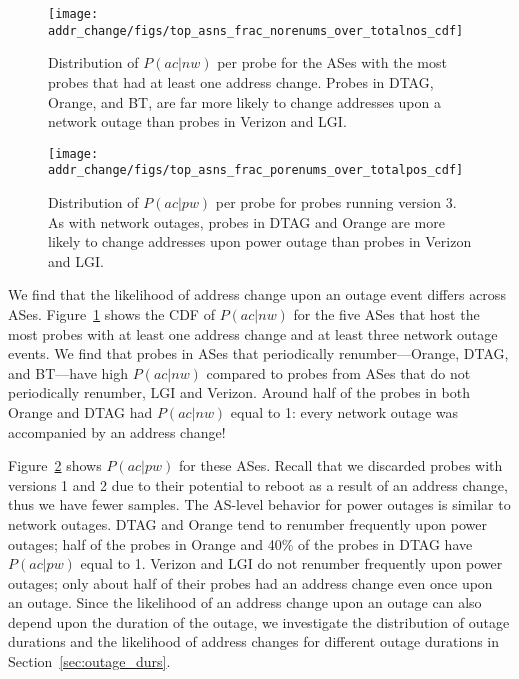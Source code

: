 \begin{figure}[tb]
  \begin{center}
    \texttt{[image: addr\_change/figs/top\_asns\_frac\_norenums\_over\_totalnos\_cdf]}
  \end{center}
  \caption{\label{fig:top_asns_frac_norenums_over_totalnos}
Distribution of $P(ac|nw)$ per probe for the ASes with the most probes
that had at least one address change. Probes in DTAG, Orange, and BT, are far more likely to change addresses upon a
    network outage than probes in Verizon and LGI.}
\end{figure}

\begin{figure}[tb]
  \begin{center}
    \texttt{[image: addr\_change/figs/top\_asns\_frac\_porenums\_over\_totalpos\_cdf]}
  \end{center}
  \caption{\label{fig:top_asns_frac_porenums_over_totalpos}
%
Distribution of $P(ac|pw)$ per probe for probes running version 3. As
with network outages, probes in DTAG and Orange are more likely
to change addresses upon power outage than probes in Verizon and LGI.}
\end{figure}

We find that the likelihood of address change upon an outage event
differs across
ASes. Figure~\ref{fig:top_asns_frac_norenums_over_totalnos} shows the
CDF of $P(ac|nw)$ for the five ASes that host the most probes with at
least one address change and at least three network outage events. We
find that probes in ASes that periodically renumber---Orange, DTAG,
and BT---have high $P(ac|nw)$ compared to probes from ASes that do not
periodically renumber, LGI and Verizon. Around half of the probes in
both Orange and DTAG had $P(ac|nw)$ equal to 1: every network outage
was accompanied by an address change!

Figure~\ref{fig:top_asns_frac_porenums_over_totalpos} shows $P(ac|pw)$
for these ASes. Recall that we discarded probes with versions 1 and 2
due to their potential to reboot as a result of an address change,
thus we have fewer samples. The AS-level behavior for power outages is
similar to network outages. DTAG and Orange tend to renumber
frequently upon power outages; half of the probes in Orange and 40\%
of the probes in DTAG have $P(ac|pw)$ equal to 1. Verizon and LGI do
not renumber frequently upon power outages; only about half of their
probes had an address change even once upon an outage. Since the
likelihood of an address change upon an outage can also depend upon
the duration of the outage, we investigate the distribution of outage
durations and the likelihood of address changes for different outage
durations in Section~\ref{sec:outage_durs}.

